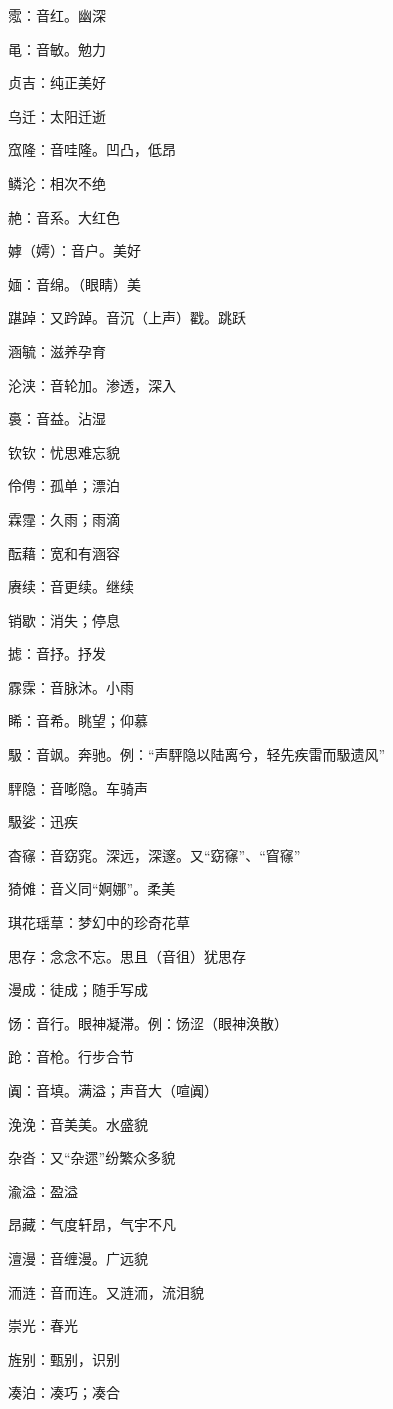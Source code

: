 霐：音红。幽深

黾：音敏。勉力

贞吉：纯正美好

乌迁：太阳迁逝

窊隆：音哇隆。凹凸，低昂

鳞沦：相次不绝

赩：音系。大红色

嫭（嫮）：音户。美好

媔：音绵。（眼睛）美

踸踔：又趻踔。音沉（上声）戳。跳跃

涵毓：滋养孕育

沦浃：音轮加。渗透，深入

裛：音益。沾湿

钦钦：忧思难忘貌

伶俜：孤单；漂泊

霖霪：久雨；雨滴

酝藉：宽和有涵容

赓续：音更续。继续

销歇：消失；停息

摅：音抒。抒发

霡霂：音脉沐。小雨

睎：音希。眺望；仰慕

馺：音飒。奔驰。例：“声駍隐以陆离兮，轻先疾雷而馺遗风”

駍隐：音嘭隐。车骑声

馺娑：迅疾

杳窱：音窈窕。深远，深邃。又“窈窱”、“窅窱”

猗傩：音义同“婀娜”。柔美

琪花瑶䓍：梦幻中的珍奇花草

思存：念念不忘。思且（音徂）犹思存

漫成：徒成；随手写成

饧：音行。眼神凝滞。例：饧涩（眼神涣散）

跄：音枪。行步合节

阗：音填。满溢；声音大（喧阗）

浼浼：音美美。水盛貌

杂沓：又“杂遝”纷繁众多貌

渝溢：盈溢

昂藏：气度轩昂，气宇不凡

澶漫：音缠漫。广远貌

洏涟：音而连。又涟洏，流泪貌

崇光：春光

旌别：甄别，识别

凑泊：凑巧；凑合

